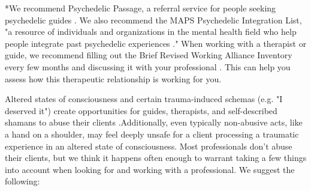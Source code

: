 \documentclass[12pt,letterpaper]{article}
\begin{document}
*We recommend Psychedelic Passage, a referral service for people seeking psychedelic guides \cite{psychedelicPassage}. We also recommend the MAPS Psychedelic Integration List, "a resource of individuals and organizations in the mental health field who help people integrate past psychedelic experiences \cite{mapsIntegrationList}." When working with a therapist or guide, we recommend filling out the Brief Revised Working Alliance Inventory every few months and discussing it with your professional \cite{BRWAIdownload,mallinckrodtBRWAI}. This can help you assess how this therapeutic relationship is working for you.

Altered states of consciousness and certain trauma-induced schemas (e.g. "I deserved it") create opportunities for guides, therapists, and self-described shamans to abuse their clients \cite{therapistAbuse}.Additionally, even typically non-abusive acts, like a hand on a shoulder, may feel deeply unsafe for a client processing a traumatic experience in an altered state of consciousness.  Most professionals don't abuse their clients, but we think it happens often enough to warrant taking a few things into account when looking for and working with a professional. We suggest the following: \todo{}
\end{document}
